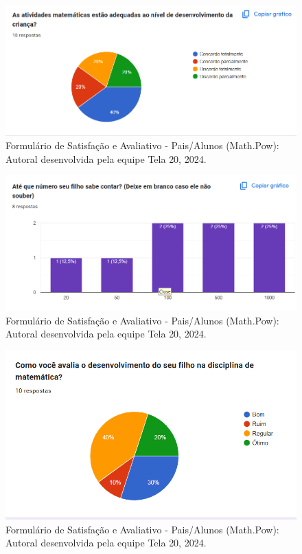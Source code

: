 \documentclass[12pt, openany, oneside, a4paper, english, brazil]{abntex2}   %
\begin{document}
\begin{figure}
    \centering
    \includegraphics{figuras/Formulário Gráficos/Pais/3 As atividades estao adequadas ao nivel de desenvolvimento da crianca.png}
    \caption{Formulário de Satisfação e Avaliativo  - Pais/Alunos (Math.Pow):  Autoral desenvolvida pela equipe Tela 20, 2024.}
    \label{gráfico gerado pelo formulário}
\end{figure}

\begin{figure}
    \centering
    \includegraphics{figuras/Formulário Gráficos/Pais/4 Ate que numero seu filho sabe contar.png}
    \caption{Formulário de Satisfação e Avaliativo  - Pais/Alunos (Math.Pow):  Autoral desenvolvida pela equipe Tela 20, 2024.}
    \label{gráfico gerado pelo formulário}
\end{figure}

\begin{figure}
    \centering
    \includegraphics{figuras/Formulário Gráficos/Pais/5 Como voce avalia o desenvolvimento do seu filho na disciplina.png}
    \caption{Formulário de Satisfação e Avaliativo  - Pais/Alunos (Math.Pow):  Autoral desenvolvida pela equipe Tela 20, 2024.}
    \label{gráfico gerado pelo formulário}
\end{figure}
\end{document}
